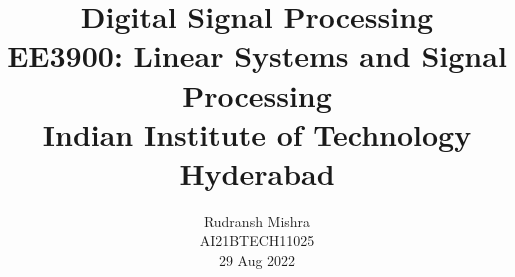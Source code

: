 \documentclass[journal,12pt,twocolumn]{IEEEtran}
\begin{document}
\let\StandardTheFigure\thefigure
\renewcommand{\thefigure}{\theproblem}



\def\putbox#1#2#3{\makebox[0in][l]{\makebox[#1][l]{}\raisebox{\baselineskip}[0in][0in]{\raisebox{#2}[0in][0in]{#3}}}}
     \def\rightbox#1{\makebox[0in][r]{#1}}
     \def\centbox#1{\makebox[0in]{#1}}
     \def\topbox#1{\raisebox{-\baselineskip}[0in][0in]{#1}}
     \def\midbox#1{\raisebox{-0.5\baselineskip}[0in][0in]{#1}}

\vspace{3cm}

\title{Digital Signal Processing \\ \Large EE3900: Linear Systems and Signal Processing \\ \large Indian Institute of Technology Hyderabad}
\author{Rudransh Mishra \\ \normalsize AI21BTECH11025 \\ \vspace*{20pt} \normalsize 29 Aug 2022}
% 
%



% 
\end{document}
